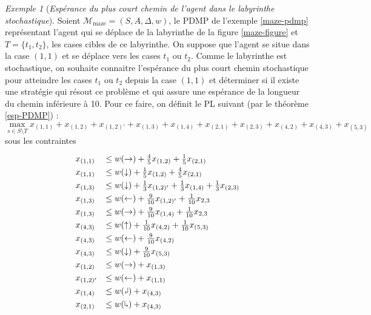 \documentclass[12pt,a4paper]{report}
\theoremstyle{definition}%
\theoremstyle{remark}
\newtheorem{example}{Exemple}[chapter]
\begin{document}
\begin{example}[\textit{Espérance du plus court chemin de l'agent dans le
	labyrinthe stochastique}]\label{sspe-example}
	Soient $\mathcal{M}_{\text{maze}} = (S, A, \Delta, w)$, le PDMP de l'exemple
	\ref{maze-pdmp} représentant l'agent qui se déplace de la labyrinthe de la
	figure \ref{maze-figure} et $T = \{ t_1, t_2 \}$, les cases cibles
	de ce labyrinthe. On suppose que l'agent se situe dans la case $(1, 1)$
	et se déplace vers les cases $t_1$ ou $t_2$. Comme le labyrinthe est
	stochastique, on souhaite connaitre l'espérance du plus court chemin stochastique pour
	atteindre les cases $t_1$ ou $t_2$ depuis la case $(1, 1)$ et déterminer si il existe une stratégie qui résout ce problème et qui assure une espérance de la longueur du chemin inférieure à 10. Pour ce faire, on
	définit le PL suivant (par le théorème \ref{esp-PDMP}) :
\[
	\max_{s \in S \setminus T}
		x_{(1, 1)} + x_{(1, 2)} + x_{(1, 2)'} + x_{(1, 3)} + x_{(1, 4)}
		+ x_{(2, 1)} + x_{(2, 3)} + x_{(4, 2)} + x_{(4, 3)} + x_{(5, 3)}
\]
sous les contraintes
\footnotesize
	\[
  \renewcommand{\arraystretch}{1.3}
  \begin{array}{ll}
		x_{(1, 1)} &\leq w(\rightarrow) + \frac{4}{5} x_{(1, 2)} + \frac{1}{5}
			x_{(2, 1)} \\
		x_{(1, 1)} &\leq w(\downarrow) + \frac{1}{5} x_{(1, 2)} + \frac{4}{5}
			x_{(2, 1)} \\
		x_{(1, 3)} &\leq w(\downarrow) + \frac{1}{3} x_{(1, 2)'} + \frac{1}{3}
		x_{(1, 4)} + \frac{1}{3} x_{(2, 3)} \\
		x_{(1, 3)} &\leq w(\leftarrow) + \frac{9}{10} x_{(1, 2)'} +
			\frac{1}{10} x_{2, 3}\\
		x_{(1, 3)} &\leq w(\rightarrow) + \frac{9}{10} x_{(1, 4)} +
			\frac{1}{10} x_{2, 3}\\
		x_{(4, 3)} &\leq w(\uparrow) + \frac{1}{10} x_{(4, 2)} + \frac{1}{10}
			x_{(5, 3)} \\
		x_{(4, 3)} &\leq w(\leftarrow) + \frac{9}{10} x_{(4, 2)} \\
		x_{(4, 3)} &\leq w(\downarrow) + \frac{9}{10} x_{(5, 3)} \\
		x_{(1, 2)} &\leq w(\rightarrow) + x_{(1, 3)} \\
		x_{(1, 2)'} &\leq w(\leftarrow) + x_{(1, 1)} \\
		x_{(1, 4)} &\leq w(\text{\rotatebox[origin=c]{180}{$\Rsh$}}) + x_{(4, 3)} \\
		x_{(2, 1)} &\leq w(\text{\rotatebox[origin=c]{180}{$\Lsh$}})
		 	+ x_{(4, 3)} \\

\end{array}\]
\end{example}
\end{document}
